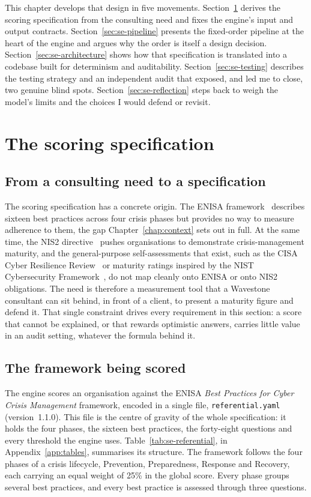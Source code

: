 This chapter develops that design in five movements.
Section~\ref{sec:se-spec} derives the scoring specification from the consulting
need and fixes the engine's input and output contracts.
Section~\ref{sec:se-pipeline} presents the fixed-order pipeline at the heart of the
engine and argues why the order is itself a design decision.
Section~\ref{sec:se-architecture} shows how that specification is translated into a
codebase built for determinism and auditability.
Section~\ref{sec:se-testing} describes the testing strategy and an independent
audit that exposed, and led me to close, two genuine blind spots.
Section~\ref{sec:se-reflection} steps back to weigh the model's limits and the
choices I would defend or revisit.


\section{The scoring specification}
\label{sec:se-spec}

\subsection{From a consulting need to a specification}

The scoring specification has a concrete origin. The ENISA framework~\cite{enisa_crisis_mgmt_2024}
describes sixteen best practices across four crisis phases but provides no way to
measure adherence to them, the gap Chapter~\ref{chap:context} sets out in full. At the same time, the NIS2 directive~\cite{nis2_directive_2022} pushes organisations
to demonstrate crisis-management maturity, and the general-purpose self-assessments
that exist, such as the CISA Cyber Resilience Review~\cite{cisacrr} or maturity
ratings inspired by the NIST Cybersecurity Framework~\cite{nist_csf2_2024}, do not map
cleanly onto ENISA or onto NIS2 obligations. The need is therefore a measurement tool
that a Wavestone consultant can sit behind, in front of a client, to present a
maturity figure and defend it. That single constraint drives every requirement in
this section: a score that cannot be explained, or that rewards optimistic answers,
carries little value in an audit setting, whatever the formula behind it.

\subsection{The framework being scored}

The engine scores an organisation against the ENISA \emph{Best Practices for Cyber
Crisis Management} framework, encoded in a single file, \texttt{referential.yaml}
(version~1.1.0). This file is the centre of gravity of the whole specification: it
holds the four phases, the sixteen best practices, the forty-eight questions and
every threshold the engine uses. Table~\ref{tab:se-referential}, in Appendix~\ref{app:tables}, summarises its
structure. The framework follows the four phases of a crisis lifecycle, Prevention,
Preparedness, Response and Recovery, each carrying an equal weight of 25\% in the
global score. Every phase groups several best practices, and every best
practice is assessed through three questions.

